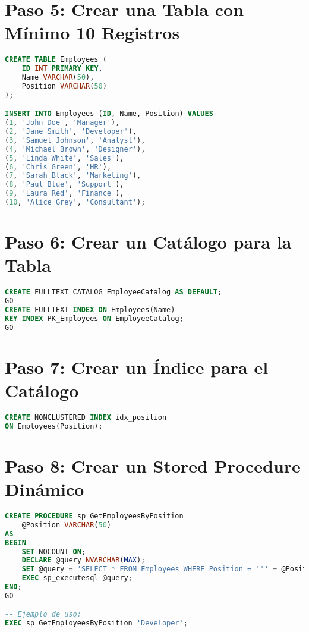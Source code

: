 \documentclass{article}
\begin{document}
\section{Paso 5: Crear una Tabla con Mínimo 10 Registros}
\begin{lstlisting}[language=SQL, caption=Crear una tabla e insertar registros]
CREATE TABLE Employees (
    ID INT PRIMARY KEY,
    Name VARCHAR(50),
    Position VARCHAR(50)
);

INSERT INTO Employees (ID, Name, Position) VALUES
(1, 'John Doe', 'Manager'),
(2, 'Jane Smith', 'Developer'),
(3, 'Samuel Johnson', 'Analyst'),
(4, 'Michael Brown', 'Designer'),
(5, 'Linda White', 'Sales'),
(6, 'Chris Green', 'HR'),
(7, 'Sarah Black', 'Marketing'),
(8, 'Paul Blue', 'Support'),
(9, 'Laura Red', 'Finance'),
(10, 'Alice Grey', 'Consultant');
\end{lstlisting}

\section{Paso 6: Crear un Catálogo para la Tabla}
\begin{lstlisting}[language=SQL, caption=Crear un catálogo]
CREATE FULLTEXT CATALOG EmployeeCatalog AS DEFAULT;
GO
CREATE FULLTEXT INDEX ON Employees(Name)
KEY INDEX PK_Employees ON EmployeeCatalog;
GO
\end{lstlisting}

\section{Paso 7: Crear un Índice para el Catálogo}
\begin{lstlisting}[language=SQL, caption=Crear un índice]
CREATE NONCLUSTERED INDEX idx_position 
ON Employees(Position);
\end{lstlisting}

\section{Paso 8: Crear un Stored Procedure Dinámico}
\begin{lstlisting}[language=SQL, caption=Stored Procedure Dinámico]
CREATE PROCEDURE sp_GetEmployeesByPosition 
    @Position VARCHAR(50)
AS
BEGIN
    SET NOCOUNT ON;
    DECLARE @query NVARCHAR(MAX);
    SET @query = 'SELECT * FROM Employees WHERE Position = ''' + @Position + '''';
    EXEC sp_executesql @query;
END;
GO

-- Ejemplo de uso:
EXEC sp_GetEmployeesByPosition 'Developer';
\end{lstlisting}
\end{document}
